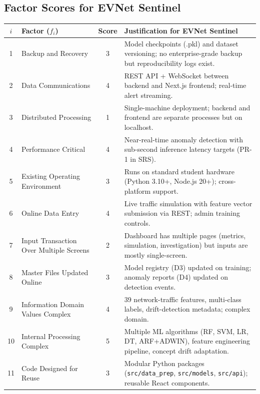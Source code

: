 \documentclass[11pt, a4paper]{article}
\begin{document}
\subsection{Factor Scores for EVNet Sentinel}

\begin{center}
\renewcommand{\arraystretch}{1.25}
\begin{tabular}{|c|l|c|p{7.5cm}|}
\hline
\textbf{$i$} & \textbf{Factor ($f_i$)} & \textbf{Score} & \textbf{Justification for EVNet Sentinel} \\ \hline
1  & Backup and Recovery                   & 3 & Model checkpoints (.pkl) and dataset versioning; no enterprise-grade backup but reproducibility logs exist. \\ \hline
2  & Data Communications                   & 4 & REST API + WebSocket between backend and Next.js frontend; real-time alert streaming. \\ \hline
3  & Distributed Processing                & 1 & Single-machine deployment; backend and frontend are separate processes but on localhost. \\ \hline
4  & Performance Critical                  & 4 & Near-real-time anomaly detection with sub-second inference latency targets (PR-1 in SRS). \\ \hline
5  & Existing Operating Environment        & 3 & Runs on standard student hardware (Python 3.10+, Node.js 20+); cross-platform support. \\ \hline
6  & Online Data Entry                     & 4 & Live traffic simulation with feature vector submission via REST; admin training controls. \\ \hline
7  & Input Transaction Over Multiple Screens & 2 & Dashboard has multiple pages (metrics, simulation, investigation) but inputs are mostly single-screen. \\ \hline
8  & Master Files Updated Online           & 3 & Model registry (D3) updated on training; anomaly reports (D4) updated on detection events. \\ \hline
9  & Information Domain Values Complex     & 4 & 39 network-traffic features, multi-class labels, drift-detection metadata; complex domain. \\ \hline
10 & Internal Processing Complex           & 5 & Multiple ML algorithms (RF, SVM, LR, DT, ARF+ADWIN), feature engineering pipeline, concept drift adaptation. \\ \hline
11 & Code Designed for Reuse               & 3 & Modular Python packages (\texttt{src/data\_prep}, \texttt{src/models}, \texttt{src/api}); reusable React components. \\ \hline

\end{tabular}
\end{center}
\end{document}
